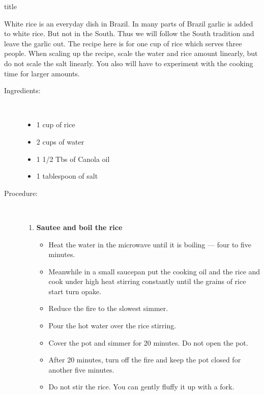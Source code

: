\documentclass [11pt, letterpaper] {article}
\begin{document}
 {title}

White rice is an everyday dish in Brazil. In many parts of Brazil garlic is added to white rice. But not in the South. Thus we will follow the South tradition and leave the garlic out. The recipe here is for one cup of rice which serves three people. When scaling up the recipe, scale the water and rice amount linearly, but do not scale the salt linearly. You also will have to experiment with the cooking time for larger amounts.

\vspace{0.3in}

\begin{description}

\item[Ingredients:]\ \\
	\begin{itemize}
	\item	1 cup of rice
	\item 2 cups of water
	\item 1 1/2 Tbs of Canola oil
	\item 1 tablespoon of salt
	\end{itemize}

\item[Procedure:]\ \\

	\begin{enumerate}
	\item {\bf Sautee and boil the rice}
	\begin{itemize}
	\item Heat the water in the microwave until it is boiling --- four to five minutes.
	\item Meanwhile in a small saucepan put the cooking oil and the rice and cook under high heat stirring constantly until the grains of rice start turn opake.
	\item Reduce the fire to the slowest simmer.
	\item Pour the hot water over the rice stirring.
	\item Cover the pot and simmer for 20 minutes. Do not open the pot.
	\item After 20 minutes, turn off the fire and keep the pot closed for another five minutes.
	\item Do not stir the rice. You can gently fluffy it up with a fork.
	\end{itemize}
	
	\end{enumerate}
\end{description}
\end{document}
